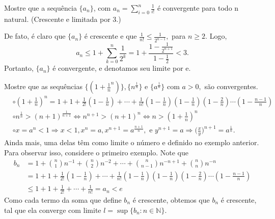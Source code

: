 \documentclass[Analysis/analysis_notes.tex]{subfiles}
\begin{document}
\begin{example}
	Mostre que a sequ\^encia $\{a_{n}\}$, com $a_{n} = \displaystyle \sum\limits_{i=0}^{n}\frac{1}{i!}$ \'e convergente para todo n natural. (Crescente e limitada por 3.)

	De fato, \'e claro que $\{a_{n}\} $ \'e crescente e que $\frac{1}{n!}\leq{\frac{1}{2^{n-1}}},$ para $n\geq{2}.$ Logo,
	$$
		a_{n}\leq{1+\sum\limits_{k=0}^{n}\frac{1}{2^{k}}} =
		1 + \frac{1-\frac{1}{2^{n+1}}}{1-\frac{1}{2}} < 3.
	$$
	Portanto, $\{a_{n}\}$ \'e convergente, e denotamos seu limite por e.
\end{example}
\begin{example}
	Mostre que as sequ\^encias $\biggl\{(1+\frac{1}{n}^{n})\biggr\}, \{n^{\frac{1}{n}}\}$ e $\{a^{\frac{1}{n}}\}$ com $a >0,$ s\~ao
	convergentes.
	\begin{align*}
		 & \circ (1+\frac{1}{n})^{n} = 1 + 1 + \frac{1}{2!}(1-\frac{1}{n}) + \cdots + \frac{1}{n!}(1-\frac{1}{n})(1-\frac{1}{n})(1-\frac{2}{n})\cdots(1-\frac{n-1}{n})        \\
		 & \circ n^{\frac{1}{n}} > (n+1)^{\frac{1}{n+1}}\Longleftrightarrow n^{n+1} > (n+1)^{n}\Longleftrightarrow n>(1+\frac{1}{n})^{n}                                      \\
		 & \circ x = a^{n} < 1\Rightarrow x < 1, x^{n} = a, x^{n+1} = a^{\frac{n+1}{n}},\text{ e } y^{n+1} = a \Rightarrow \biggl(\frac{x}{y}\biggr)^{n+1} = a^{\frac{1}{n}}.
	\end{align*}
	Ainda mais, uma delas t\^em como limite o n\'umero e definido no exemplo anterior. Para observar isso, considere o primeiro exemplo. Note que
	\begin{align*}
		b_{n} & = 1 + \binom{n}{1}n^{-1} + \binom{n}{2}n^{-2} + \cdots + \binom{n}{n-1}n^{-n+1} + \binom{n}{n}n^{-n}                              \\
		      & = 1 + 1 + \frac{1}{2!}(1-\frac{1}{n}) + \cdots + \frac{1}{n!}(1-\frac{1}{n})(1-\frac{1}{n})(1-\frac{2}{n})\cdots(1-\frac{n-1}{n}) \\
		      & \leq{1 + 1 + \frac{1}{2!} + \cdots + \frac{1}{n!} = a_{n} < e}
	\end{align*}
	Como cada termo da soma que define $b_{n}$ \'e crescente, obtemos que $b_{n}$ \'e crescente, tal que ela converge com limite $l = \sup{\{b_{n}:n\in \mathbb{N}\}}$.


\end{example}
\end{document}
